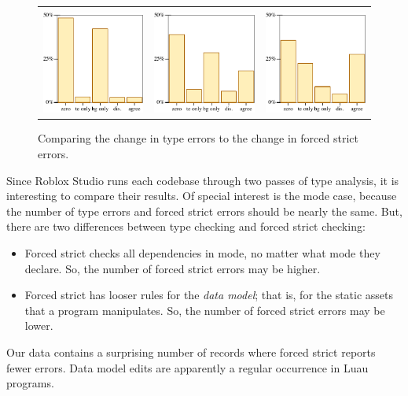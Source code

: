 \documentclass[english,submission,cleveref]{programming}
\begin{document}
\begin{figure}[t]\centering
  \begin{tabular}{lll}
    \mnocheck{} & \mnonstrict{} & \mstrict{} \\
    \includegraphics[width=0.3\columnwidth]{img/compass-nocheck.pdf}
    &
    \includegraphics[width=0.3\columnwidth]{img/compass-nonstrict.pdf}
    &
    \includegraphics[width=0.3\columnwidth]{img/compass-strict.pdf}
  \end{tabular}
  \caption{Comparing the change in type errors to the change in forced strict errors.}
  \label{f:tefs-compass}
\end{figure}

Since Roblox Studio runs each codebase through two passes of type analysis,
it is interesting to compare their results.
Of special interest is the \mstrict{} mode case, because the number of
type errors and forced strict errors should be nearly the same.
But, there are two differences between \mstrict{} type checking
and forced strict checking:
\begin{itemize}
  \item
    Forced strict checks all dependencies in \mstrict{} mode, no matter
    what mode they declare.
    So, the number of forced strict errors may be higher.
  \item
    Forced strict has looser rules for the \emph{data model};
    that is, for the static assets that a program manipulates.
    So, the number of forced strict errors may be lower.
\end{itemize}
Our data contains a surprising number of records where forced strict
reports fewer errors.
Data model edits are apparently a regular occurrence in Luau programs.
\end{document}
